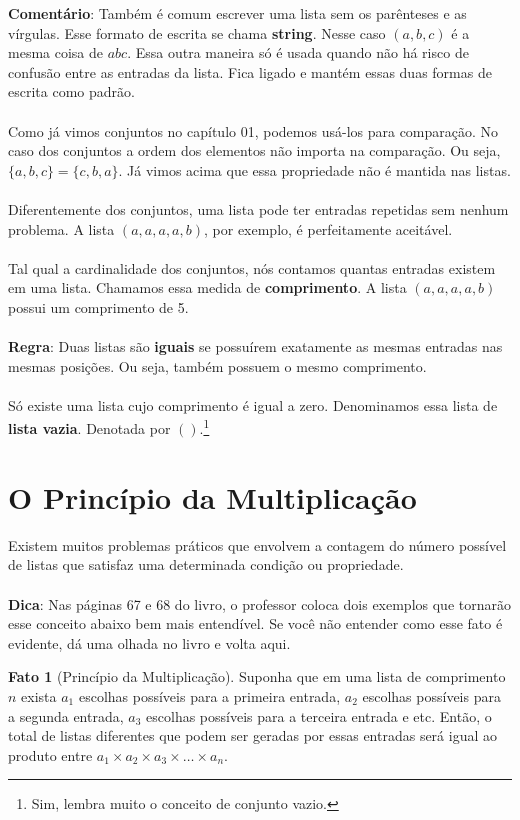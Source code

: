 \documentclass[a4paper,11pt]{book}
\theoremstyle{definition}
\theoremstyle{break}
\newtheorem{fact}{Fato}[section]
\begin{document}
\textbf{Comentário}: Também é comum escrever uma lista sem os parênteses e as vírgulas. Esse formato de escrita se chama \textbf{string}. Nesse caso $(a,b,c)$ é a mesma coisa de $abc$. Essa outra maneira só é usada quando não há risco de confusão entre as entradas da lista. Fica ligado e mantém essas duas formas de escrita como padrão.
\\
\\
Como já vimos conjuntos no capítulo 01, podemos usá-los para comparação. No caso dos conjuntos a ordem dos elementos não importa na comparação. Ou seja, $\{a,b,c\} = \{c,b,a\}$. Já vimos acima que essa propriedade não é mantida nas listas. 
\\
\\
Diferentemente dos conjuntos, uma lista pode ter entradas repetidas sem nenhum problema. A lista $(a,a,a,a,b)$, por exemplo, é perfeitamente aceitável.
\\
\\
Tal qual a cardinalidade dos conjuntos, nós contamos quantas entradas existem em uma lista. Chamamos essa medida de \textbf{comprimento}. A lista $(a,a,a,a,b)$ possui um comprimento de 5.
\\
\\
\textbf{Regra}: Duas listas são \textbf{iguais} se possuírem exatamente as mesmas entradas nas mesmas posições. Ou seja, também possuem o mesmo comprimento.
\\
\\
Só existe uma lista cujo comprimento é igual a zero. Denominamos essa lista de \textbf{lista vazia}. Denotada por $()$.\footnote{Sim, lembra muito o conceito de conjunto vazio.}

\section{O Princípio da Multiplicação}

Existem muitos problemas práticos que envolvem a contagem do número possível de listas que satisfaz uma determinada condição ou propriedade.
\\
\\
\textbf{Dica}: Nas páginas 67 e 68 do livro, o professor coloca dois exemplos que tornarão esse conceito abaixo bem mais entendível. Se você não entender como esse fato é evidente, dá uma olhada no livro e volta aqui.

\begin{fact}[Princípio da Multiplicação]
Suponha que em uma lista de comprimento $n$ exista $a_1$ escolhas possíveis para a primeira entrada, $a_2$ escolhas possíveis para a segunda entrada, $a_3$ escolhas possíveis para a terceira entrada e etc. Então, o total de listas diferentes que podem ser geradas por essas entradas será igual ao produto entre $a_1 \times a_2 \times a_3 \times \dots \times a_n$. 
\end{fact}
\end{document}
